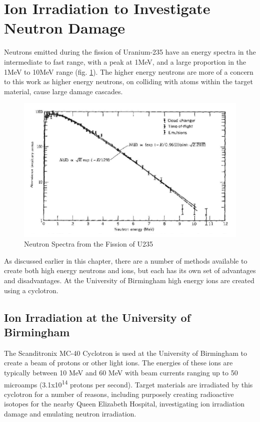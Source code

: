 \FloatBarrier
\section[Emulating Neutron Damage]{Ion Irradiation to Investigate Neutron Damage}

Neutrons emitted during the fission of Uranium-235 have an energy spectra in the intermediate to fast range, with a peak at 1MeV, and a large proportion in the 1MeV to 10MeV range (fig. \ref{fig:u235neutronspectra}).  The higher energy neutrons are more of a concern to this work as higher energy neutrons, on colliding with atoms within the target material, cause large damage cascades.  

\begin{figure}[tbp]
  \begin{center}
    \includegraphics[width=.7\linewidth]{chapters/isotope_activation_and_radioactive_decay/plots/neutronspectrau235fission.png}
    \caption{Neutron Spectra from the Fission of U235\cite{leachmanneutrons}}
    \label{fig:u235neutronspectra}
  \end{center}
\end{figure}

As discussed earlier in this chapter, there are a number of methods available to create both high energy neutrons and ions, but each has its own set of advantages and disadvantages.  At the University of Birmingham high energy ions are created using a cyclotron.

\FloatBarrier

\subsection{Ion Irradiation at the University of Birmingham}

The Scanditronix MC-40 Cyclotron is used at the University of Birmingham to create a beam of protons or other light ions.  The energies of these ions are typically between 10 MeV and 60 MeV with beam currents ranging up to 50 microamps (3.1x10\textsuperscript{14} protons per second).  Target materials are irradiated by this cyclotron for a number of reasons, including purposely creating radioactive isotopes for the nearby Queen Elizabeth Hospital, investigating ion irradiation damage and emulating neutron irradiation.

